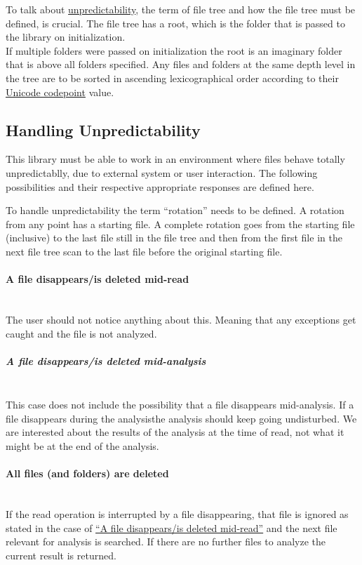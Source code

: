 \documentclass[11pt]{article} %
\begin{document}
    To talk about \hyperref[sec:3.1]{unpredictability}, the term of file tree and how the file tree must be defined, is crucial. The file tree has a root, which is the folder that is passed to the library on initialization.\\If multiple folders were passed on initialization the root is an imaginary folder that is above all folders specified. Any files and folders at the same depth level in the tree are to be sorted in ascending lexicographical order according to their \href{https://en.wikipedia.org/wiki/Code_point}{Unicode codepoint} value.


    \subsection{Handling Unpredictability}\label{sec:3.2}

    This library must be able to work in an environment where files behave totally unpredictablly, due to external system or user interaction. The following possibilities and their respective appropriate responses are defined here.

    To handle unpredictability the term ``rotation'' needs to be defined. A rotation from any point has a starting file. A complete rotation goes from the starting file (inclusive) to the last file still in the file tree and then from the first file in the next file tree scan to the last file before the original starting file.


    \paragraph{A file disappears/is deleted mid-read}\label{par:file_disappear} ~\\
    The user should not notice anything about this. Meaning that any exceptions get caught and the file is not analyzed.


    \subparagraph{A file disappears/is deleted mid-analysis} ~\\
    This case does not include the possibility that a file disappears mid-analysis. If a file disappears during the analysisthe analysis should keep going undisturbed. We are interested about the results of the analysis at the time of read, not what it might be at the end of the analysis.


    \paragraph{All files (and folders) are deleted}\label{par:everything_deleted} ~\\
    If the read operation is interrupted by a file disappearing, that file is ignored as stated in the case of \hyperref[par:file_disappear]{``A file disappears/is deleted mid-read''} and the next file relevant for analysis is searched. If there are no further files to analyze the current result is returned.
\end{document}
